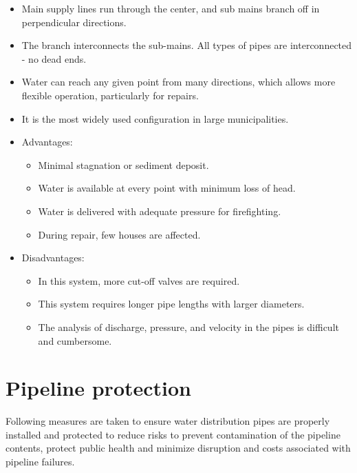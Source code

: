 \begin{itemize}
\item Main supply lines run through the center, and sub mains branch off in perpendicular directions. 
\item The branch interconnects the sub-mains. All types of pipes are interconnected - no dead ends.
\item Water can reach any given point from many directions, which allows more flexible operation, particularly for repairs.
\item  It is the most widely used configuration in large municipalities. 
\item Advantages:\\
      \begin{itemize}
        \item Minimal stagnation or sediment deposit.
        \item Water is available at every point with minimum loss of head.
        \item Water is delivered with adequate pressure for firefighting.
        \item During repair, few houses are affected.
      \end{itemize}
\item Disadvantages:\\
       \begin{itemize}
        \item In this system, more cut-off valves are required.
        \item This system requires longer pipe lengths with larger diameters.
        \item The analysis of discharge, pressure, and velocity in the pipes is difficult and cumbersome.
      \end{itemize}
      \end{itemize}

\section{Pipeline protection} 
Following measures are taken to ensure water distribution pipes are properly installed and protected to reduce risks to prevent contamination of the pipeline contents, protect public health and minimize disruption and costs associated with pipeline failures. 

